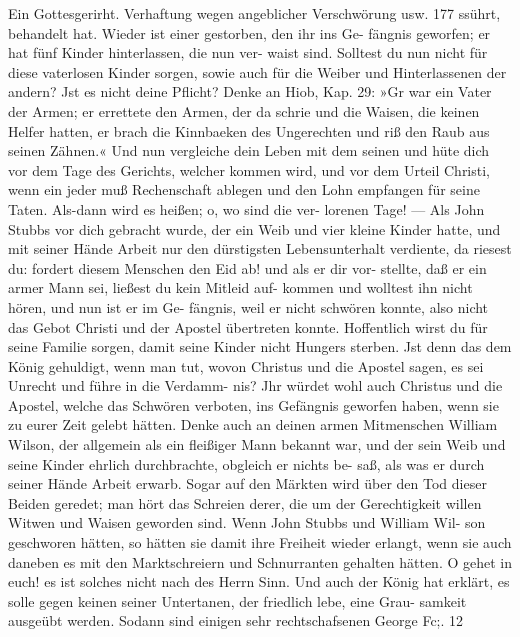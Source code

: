 Ein Gottesgerirht. Verhaftung wegen angeblicher Verschwörung usw. 177
ssührt, behandelt hat. Wieder ist einer gestorben, den ihr ins Ge-
fängnis geworfen; er hat fünf Kinder hinterlassen, die nun ver-
waist sind. Solltest du nun nicht für diese vaterlosen Kinder
sorgen, sowie auch für die Weiber und Hinterlassenen der andern?
Jst es nicht deine Pflicht? Denke an Hiob, Kap. 29: »Gr war
ein Vater der Armen; er errettete den Armen, der da schrie und
die Waisen, die keinen Helfer hatten, er brach die Kinnbaeken des
Ungerechten und riß den Raub aus seinen Zähnen.« Und nun
vergleiche dein Leben mit dem seinen und hüte dich vor dem Tage
des Gerichts, welcher kommen wird, und vor dem Urteil Christi,
wenn ein jeder muß Rechenschaft ablegen und den Lohn empfangen
für seine Taten. Als-dann wird es heißen; o, wo sind die ver-
lorenen Tage! — Als John Stubbs vor dich gebracht wurde, der
ein Weib und vier kleine Kinder hatte, und mit seiner Hände
Arbeit nur den dürstigsten Lebensunterhalt verdiente, da riesest
du: fordert diesem Menschen den Eid ab! und als er dir vor-
stellte, daß er ein armer Mann sei, ließest du kein Mitleid auf-
kommen und wolltest ihn nicht hören, und nun ist er im Ge-
fängnis, weil er nicht schwören konnte, also nicht das Gebot
Christi und der Apostel übertreten konnte. Hoffentlich wirst du für
seine Familie sorgen, damit seine Kinder nicht Hungers sterben.
Jst denn das dem König gehuldigt, wenn man tut, wovon Christus
und die Apostel sagen, es sei Unrecht und führe in die Verdamm-
nis? Jhr würdet wohl auch Christus und die Apostel, welche
das Schwören verboten, ins Gefängnis geworfen haben, wenn sie
zu eurer Zeit gelebt hätten.
Denke auch an deinen armen Mitmenschen William Wilson,
der allgemein als ein fleißiger Mann bekannt war, und der sein
Weib und seine Kinder ehrlich durchbrachte, obgleich er nichts be-
saß, als was er durch seiner Hände Arbeit erwarb. Sogar auf
den Märkten wird über den Tod dieser Beiden geredet; man hört
das Schreien derer, die um der Gerechtigkeit willen Witwen und
Waisen geworden sind. Wenn John Stubbs und William Wil-
son geschworen hätten, so hätten sie damit ihre Freiheit wieder
erlangt, wenn sie auch daneben es mit den Marktschreiern und
Schnurranten gehalten hätten. O gehet in euch! es ist solches
nicht nach des Herrn Sinn. Und auch der König hat erklärt, es
solle gegen keinen seiner Untertanen, der friedlich lebe, eine Grau-
samkeit ausgeübt werden. Sodann sind einigen sehr rechtschafsenen
George Fc;. 12



